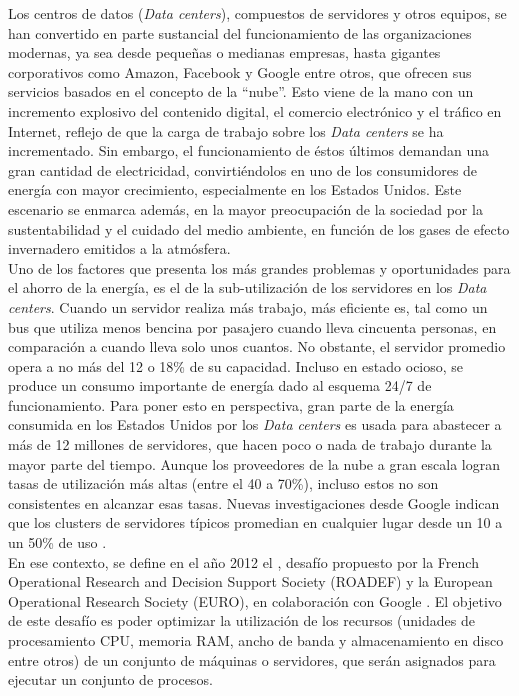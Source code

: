 \documentclass[../informe2.tex]{subfiles}
\begin{document}

Los centros de datos (\textit{Data centers}), compuestos de servidores y otros equipos, se han convertido en parte sustancial del funcionamiento de las organizaciones modernas, ya sea desde pequeñas o medianas empresas, hasta gigantes corporativos como Amazon, Facebook y Google entre otros, que ofrecen sus servicios basados en el concepto de la ``nube''. Esto viene de la mano con un incremento explosivo del contenido digital, el comercio electrónico y el tráfico en Internet, reflejo de que la carga de trabajo sobre los \textit{Data centers} se ha incrementado. Sin embargo, el funcionamiento de éstos últimos demandan una gran cantidad de electricidad, convirtiéndolos en uno de los consumidores de energía con mayor crecimiento, especialmente en los Estados Unidos. Este escenario se enmarca además, en la mayor preocupación de la sociedad por la sustentabilidad y el cuidado del medio ambiente, en función de los gases de efecto invernadero emitidos a la atmósfera. \\
Uno de los factores que presenta los más grandes problemas y oportunidades para el ahorro de la energía, es el de la sub-utilización de los servidores en los \textit{Data centers}.
Cuando un servidor realiza más trabajo, más eficiente es, tal como un bus que utiliza menos bencina por pasajero cuando lleva cincuenta personas, en comparación a cuando lleva solo unos cuantos. No obstante, el servidor promedio opera a no más del 12 o 18\% de su capacidad. Incluso en estado ocioso, se produce un consumo importante de energía dado al esquema 24/7 de funcionamiento. Para poner esto en perspectiva, gran parte de la energía consumida en los Estados Unidos por los \textit{Data centers} es usada para abastecer a más de 12 millones de servidores, que hacen poco o nada de trabajo durante la mayor parte del tiempo. Aunque los proveedores de la nube a gran escala logran tasas de utilización más altas (entre el 40 a 70\%), incluso estos no son consistentes en alcanzar esas tasas. Nuevas investigaciones desde Google indican que los clusters de servidores típicos promedian en cualquier lugar desde un 10 a un 50\% de uso \cite{DCEfficiencyAssessment}. \\
En ese contexto, se define en el año 2012  el \mrp, desafío propuesto por la French Operational Research and Decision Support Society (ROADEF) y la European Operational Research Society (EURO), en colaboración con Google \cite{2012ProblemDefinition}. El objetivo de este desafío es poder optimizar la utilización de los recursos (unidades de procesamiento CPU, memoria RAM, ancho de banda y almacenamiento en disco entre otros) de un conjunto de máquinas o servidores, que serán asignados para ejecutar un conjunto de procesos. \\
\end{document}
